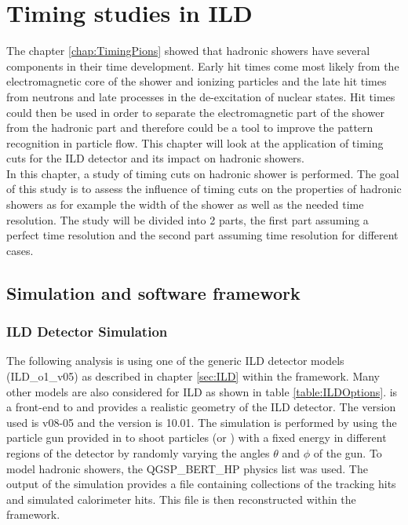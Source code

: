 \chapter{Timing studies in ILD}
\label{chap:ILDTiming}

The chapter \ref{chap:TimingPions} showed that hadronic showers have several components in their time development. Early hit times come most likely from the electromagnetic core of the shower and ionizing particles and the late hit times from neutrons and late processes in the de-excitation of nuclear states. Hit times could then be used in order to separate the electromagnetic part of the shower from the hadronic part and therefore could be a tool to improve the pattern recognition in particle flow. This chapter will look at the application of timing cuts for the ILD detector and its impact on hadronic showers.\\

In this chapter, a study of timing cuts on hadronic shower is performed. The goal of this study is to assess the influence of timing cuts on the properties of hadronic showers as for example the width of the shower as well as the needed time resolution. The study will be divided into 2 parts, the first part assuming a perfect time resolution and the second part assuming time resolution for different cases.

\section{Simulation and software framework}

\subsection{ILD Detector Simulation}

The following analysis is using one of the generic ILD detector models (ILD\_o1\_v05) as described in chapter \ref{sec:ILD} within the \mokka framework. Many other models are also considered for ILD as shown in table \ref{table:ILDOptions}. \mokka is a front-end to \geant and provides a realistic geometry of the ILD detector. The \mokka version used is v08-05 and the \geant version is 10.01.
The simulation is performed by using the particle gun provided in \geant to shoot particles (\piminus or \kzeroL) with a fixed energy in different regions of the detector by randomly varying the angles $\theta$ and $\phi$ of the gun. To model hadronic showers, the QGSP\_BERT\_HP physics list was used. The output of the simulation provides a \lcio file containing collections of the tracking hits and simulated calorimeter hits. This file is then reconstructed within the \marlin framework.

